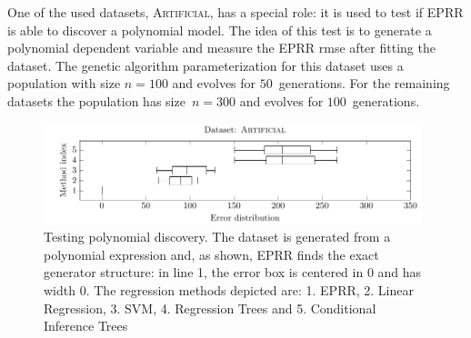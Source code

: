 \documentclass[preprint,authoryear,12pt]{elsarticle}
\begin{document}
One of the used datasets, \textsc{Artificial}, has a special role: it is used to test if \ac{EPRR} is able to discover a polynomial model. The idea of this test is to generate a polynomial dependent variable and measure the \ac{EPRR} \ac{rmse} after fitting the dataset. The genetic algorithm parameterization for this dataset uses a population with size $n=100$ and evolves for $50$~generations. For the remaining datasets the population has size~$n=300$ and evolves for $100$~generations.

\begin{figure}[tb]\begin{center}
\includegraphics[width=0.98\textwidth]{figure_2.pdf}
\caption{Testing polynomial discovery. The dataset is generated from a polynomial expression and, as shown, \ac{EPRR} finds the exact generator structure: in line 1, the error box is centered in $0$ and has width $0$.  The regression methods depicted are: 1. \ac{EPRR}, 2. Linear Regression, 3. SVM, 4. Regression Trees and 5. Conditional Inference Trees}
\label{artificial_dataset1_lambda1.0}
\end{center}
\end{figure}
\end{document}
